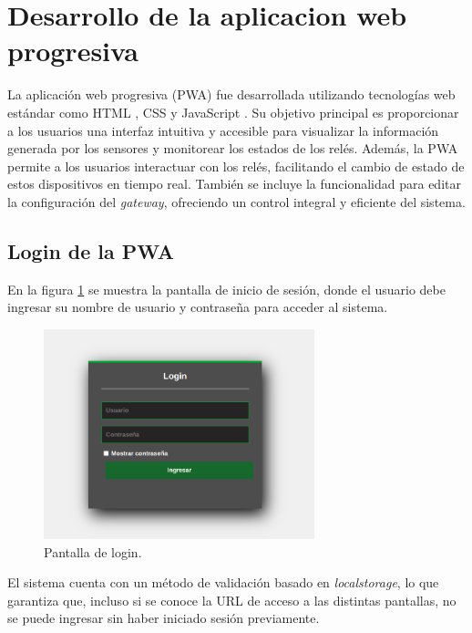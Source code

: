 \section{Desarrollo de la aplicacion web progresiva}

La aplicación web progresiva (PWA) fue desarrollada utilizando tecnologías web estándar como HTML \citep{html}, CSS \citep{css} y JavaScript \citep{js}. Su objetivo principal es proporcionar a los usuarios una interfaz intuitiva y accesible para visualizar la información generada por los sensores y monitorear los estados de los relés. Además, la PWA permite a los usuarios interactuar con los relés, facilitando el cambio de estado de estos dispositivos en tiempo real. También se incluye la funcionalidad para editar la configuración del \textit{gateway}, ofreciendo un control integral y eficiente del sistema.

\subsection{Login de la PWA}

En la figura \ref{fig:login} se muestra la pantalla de inicio de sesión, donde el usuario debe ingresar su nombre de usuario y contraseña para acceder al sistema. 

\begin{figure}[H]
\centering 
\includegraphics[width=0.7\textwidth]{./Figures/login.png}
\caption{Pantalla de login.}
\label{fig:login}
\end{figure}


El sistema cuenta con un método de validación basado en \textit{localstorage}, lo que garantiza que, incluso si se conoce la URL de acceso a las distintas pantallas, no se puede ingresar sin haber iniciado sesión previamente. 

